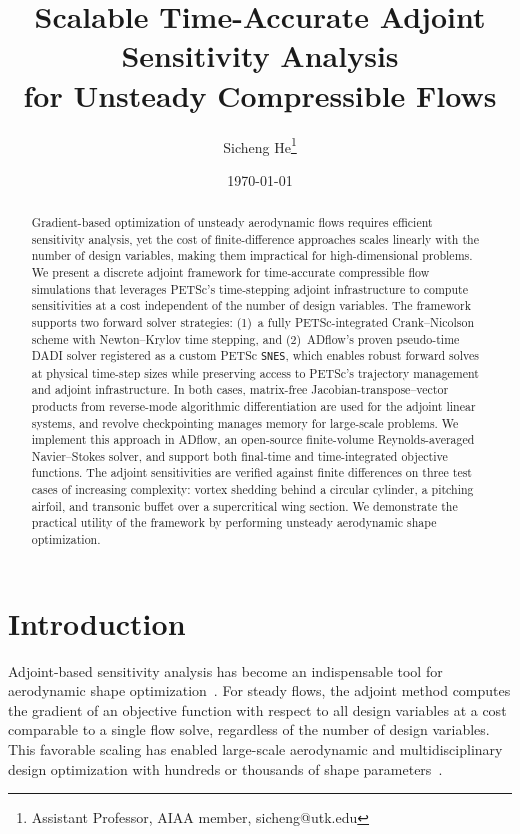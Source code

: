 \documentclass[journal]{new-aiaa}
\title{Scalable Time-Accurate Adjoint Sensitivity Analysis \\for Unsteady Compressible Flows}
\author{Sicheng He\footnote{Assistant Professor, AIAA member, sicheng@utk.edu}}
\affil{University of Tennessee, Department of Mechanical and Aerospace Engineering, Knoxville, TN 37996}
\date{\today}
\begin{document}
\maketitle{}


\begin{abstract}
Gradient-based optimization of unsteady aerodynamic flows requires efficient sensitivity analysis, yet the cost of finite-difference approaches scales linearly with the number of design variables, making them impractical for high-dimensional problems.
We present a discrete adjoint framework for time-accurate compressible flow simulations that leverages PETSc's time-stepping adjoint infrastructure to compute sensitivities at a cost independent of the number of design variables.
The framework supports two forward solver strategies: (1)~a fully PETSc-integrated Crank--Nicolson scheme with Newton--Krylov time stepping, and (2)~ADflow's proven pseudo-time DADI solver registered as a custom PETSc \texttt{SNES}, which enables robust forward solves at physical time-step sizes while preserving access to PETSc's trajectory management and adjoint infrastructure.
In both cases, matrix-free Jacobian-transpose--vector products from reverse-mode algorithmic differentiation are used for the adjoint linear systems, and revolve checkpointing manages memory for large-scale problems.
We implement this approach in ADflow, an open-source finite-volume Reynolds-averaged Navier--Stokes solver, and support both final-time and time-integrated objective functions.
The adjoint sensitivities are verified against finite differences on three test cases of increasing complexity: vortex shedding behind a circular cylinder, a pitching airfoil, and transonic buffet over a supercritical wing section.
We demonstrate the practical utility of the framework by performing unsteady aerodynamic shape optimization.
\end{abstract}

\section{Introduction}\label{sec:introduction}
Adjoint-based sensitivity analysis has become an indispensable tool for aerodynamic shape optimization~\cite{Pironneau1974, Jameson1988, Martins2013}.
For steady flows, the adjoint method computes the gradient of an objective function with respect to all design variables at a cost comparable to a single flow solve, regardless of the number of design variables.
This favorable scaling has enabled large-scale aerodynamic and multidisciplinary design optimization with hundreds or thousands of shape parameters~\cite{Kenway2019, He2018}.
\end{document}
